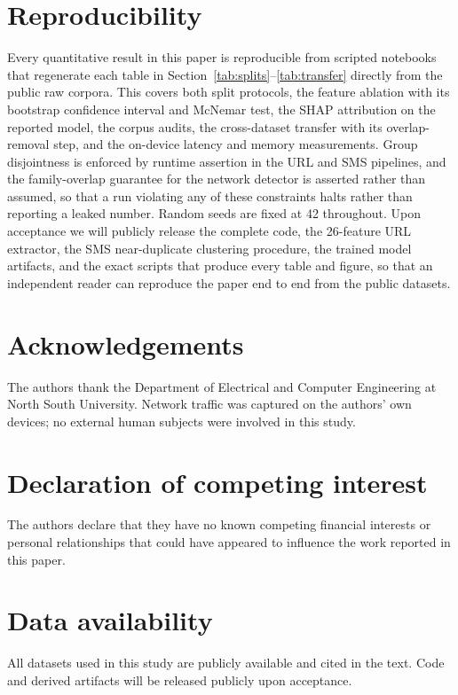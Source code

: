 \documentclass[preprint,12pt,number]{elsarticle}
\begin{document}
\section{Reproducibility}
Every quantitative result in this paper is reproducible from scripted notebooks that regenerate each table in Section~\ref{tab:splits}--\ref{tab:transfer} directly from the public raw corpora. This covers both split protocols, the feature ablation with its bootstrap confidence interval and McNemar test, the SHAP attribution on the reported model, the corpus audits, the cross-dataset transfer with its overlap-removal step, and the on-device latency and memory measurements. Group disjointness is enforced by runtime assertion in the URL and SMS pipelines, and the family-overlap guarantee for the network detector is asserted rather than assumed, so that a run violating any of these constraints halts rather than reporting a leaked number. Random seeds are fixed at 42 throughout. Upon acceptance we will publicly release the complete code, the 26-feature URL extractor, the SMS near-duplicate clustering procedure, the trained model artifacts, and the exact scripts that produce every table and figure, so that an independent reader can reproduce the paper end to end from the public datasets.

\section*{Acknowledgements}
The authors thank the Department of Electrical and Computer Engineering at North South University. Network traffic was captured on the authors' own devices; no external human subjects were involved in this study.

\section*{Declaration of competing interest}
The authors declare that they have no known competing financial interests or personal relationships that could have appeared to influence the work reported in this paper.

\section*{Data availability}
All datasets used in this study are publicly available and cited in the text. Code and derived artifacts will be released publicly upon acceptance.
\end{document}
